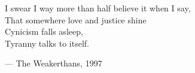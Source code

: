 \begin{flushright}
\begin{hangleftquote}{\QENOpen}{\QENClose}
I swear I way more than half believe it when I say,\\
That somewhere love and justice shine\\
Cynicism falls asleep,\\
Tyranny talks to itself.
\end{hangleftquote}
\par\smallskip
\normalfont — The Weakerthans, 1997
\end{flushright}
